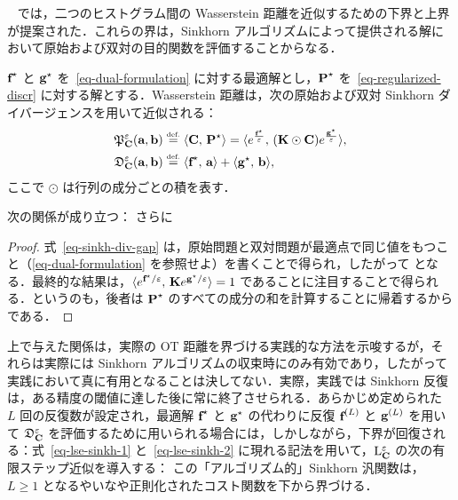 ~\citep{CuturiSinkhorn} では，二つのヒストグラム間の Wasserstein 距離を近似するための下界と上界が提案された．これらの界は，Sinkhorn アルゴリズムによって提供される解において原始および双対の目的関数を評価することからなる．

\begin{defn}
	$\fD^\star$ と $\gD^\star$ を~\eqref{eq-dual-formulation} に対する最適解とし，$\P^\star$ を~\eqref{eq-regularized-discr} に対する解とする．Wasserstein 距離は，次の原始および双対 Sinkhorn ダイバージェンスを用いて近似される：
\begin{align*}
	\SINKHORNP_\C^\varepsilon(\a,\b)& \eqdef \dotp{\C}{\P^\star} =  \dotp{e^{\frac{\fD^\star}{\varepsilon}}}{(\K\odot \C)e^{\frac{\gD^\star}{\varepsilon}}}, \\
	\SINKHORND_\C^\varepsilon(\a,\b) & \eqdef \dotp{\fD^\star}{\a} + \dotp{\gD^\star}{\b},
\end{align*}
ここで $\odot$ は行列の成分ごとの積を表す．
\end{defn}

\begin{prop}\label{prop-sinkhorn-div}
次の関係が成り立つ：
さらに
\end{prop}
\begin{proof}
式~\eqref{eq-sinkh-div-gap} は，原始問題と双対問題が最適点で同じ値をもつこと（\eqref{eq-dual-formulation} を参照せよ）を書くことで得られ，したがって
となる．最終的な結果は，$\dotp{e^{\fD^\star/\varepsilon} }{ \K e^{\gD^\star/\varepsilon}}=1$ であることに注目することで得られる．というのも，後者は $\P^\star$ のすべての成分の和を計算することに帰着するからである．
\end{proof}


上で与えた関係は，実際の OT 距離を界づける実践的な方法を示唆するが，それらは実際には Sinkhorn アルゴリズムの収束時にのみ有効であり，したがって実践において真に有用となることは決してない．実際，実践では Sinkhorn 反復は，ある精度の閾値に達した後に常に終了させられる．あらかじめ定められた $L$ 回の反復数が設定され，最適解 $\fD^\star$ と $\gD^\star$ の代わりに反復 $\itL{\fD}$ と $\itL{\gD}$ を用いて $\SINKHORND_\C^\varepsilon$ を評価するために用いられる場合には，しかしながら，下界が回復される：式~\eqref{eq-lse-sinkh-1} と~\eqref{eq-lse-sinkh-2} に現れる記法を用いて，$\MKD_\C^\varepsilon$ の次の有限ステップ近似を導入する：
この「アルゴリズム的」Sinkhorn 汎関数は，$L\geq 1$ となるやいなや正則化されたコスト関数を下から界づける．


